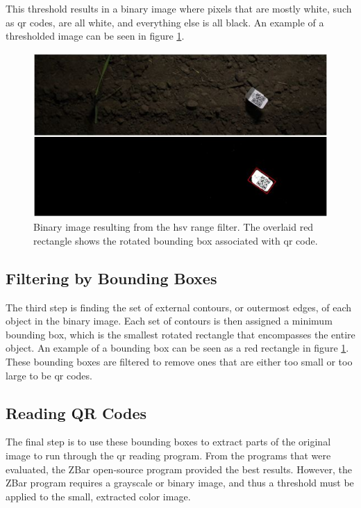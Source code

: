 This threshold results in a binary image where pixels that are mostly white, such as \ac{qr} codes, are all white, and everything else is all black.  An example of a thresholded image can be seen in figure \ref{figure:code_extraction}.

\begin{figure}
	\centering
    \includegraphics[width=5in]{figures/code_extraction_step1.jpg}
    \caption[Thresholded image]{Binary image resulting from the \ac{hsv} range filter.  The overlaid red rectangle shows the rotated bounding box associated with \ac{qr} code.}
    \label{figure:code_extraction}
\end{figure} 

\subsection{Filtering by Bounding Boxes}

The third step is finding the set of external contours, or outermost edges, of each object in the binary image.  Each set of contours is then assigned a minimum bounding box, which is the smallest rotated rectangle that encompasses the entire object.  An example of a bounding box can be seen as a red rectangle in figure \ref{figure:code_extraction}.  These bounding boxes are filtered to remove ones that are either too small or too large to be \ac{qr} codes.

\subsection{Reading QR Codes}
\label{section:reading_codes}

The final step is to use these bounding boxes to extract parts of the original image to run through the \ac{qr} reading program.  From the programs that were evaluated, the ZBar open-source program provided the best results.  However, the ZBar program requires a grayscale or binary image, and thus a threshold must be applied to the small, extracted color image. 

